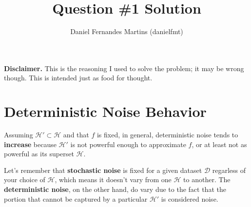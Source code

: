 \documentclass{article}
\author{Daniel Fernandes Martins (danielfmt)}
\title{Question \#1 Solution}
\begin{document}
\maketitle

\textbf{Disclaimer.} This is the reasoning I used to solve the problem; it
may be wrong though. This is intended just as food for thought.

\section{Deterministic Noise Behavior}

Assuming $\mathcal{H}' \subset \mathcal{H}$ and that $f$ is fixed, in general,
deterministic noise tends to \textbf{increase} because $\mathcal{H}'$ is not
powerful enough to approximate $f$, or at least not as powerful as its
superset $\mathcal{H}$.

Let's remember that \textbf{stochastic noise} is fixed for a given dataset
$\mathcal{D}$ regarless of your choice of $\mathcal{H}$, which means it doesn't
vary from one $\mathcal{H}$ to another. The \textbf{deterministic noise}, on the
other hand, do vary due to the fact that the portion that cannot be captured by
a particular $\mathcal{H}'$ is considered noise.
\end{document}
